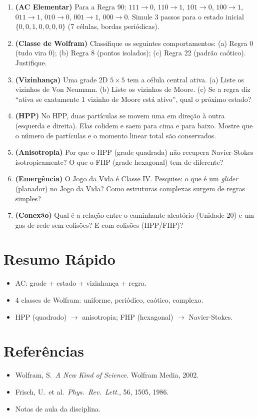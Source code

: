 \documentclass[12pt,a4paper]{article}
\begin{document}
\begin{enumerate}
  \item \textbf{(AC Elementar)} Para a Regra 90: $111\to0$, $110\to1$, $101\to0$, $100\to1$, $011\to1$, $010\to0$, $001\to1$, $000\to0$. Simule 3 passos para o estado inicial $\{0,0,1,0,0,0,0\}$ (7 c\'elulas, bordas peri\'odicas).
  
  \item \textbf{(Classe de Wolfram)} Classifique os seguintes comportamentos: (a) Regra 0 (tudo vira 0); (b) Regra 8 (pontos isolados); (c) Regra 22 (padr\~ao ca\'otico). Justifique.
  
  \item \textbf{(Vizinhan\c{c}a)} Uma grade 2D $5\times5$ tem a c\'elula central ativa. (a) Liste os vizinhos de Von Neumann. (b) Liste os vizinhos de Moore. (c) Se a regra diz ``ativa se exatamente 1 vizinho de Moore est\'a ativo'', qual o pr\'oximo estado?
  
  \item \textbf{(HPP)} No HPP, duas part\'iculas se movem uma em dire\c{c}\~ao \`a outra (esquerda e direita). Elas colidem e saem para cima e para baixo. Mostre que o n\'umero de part\'iculas e o momento linear total s\~ao conservados.
  
  \item \textbf{(Anisotropia)} Por que o HPP (grade quadrada) n\~ao recupera Navier-Stokes isotropicamente? O que o FHP (grade hexagonal) tem de diferente?
  
  \item \textbf{(Emergência)} O Jogo da Vida \'e Classe IV. Pesquise: o que \'e um \textit{glider} (planador) no Jogo da Vida? Como estruturas complexas surgem de regras simples?
  
  \item \textbf{(Conexão)} Qual \'e a rela\c{c}\~ao entre o caminhante aleat\'orio (Unidade 20) e um gas de rede sem colis\~oes? E com colis\~oes (HPP/FHP)?
\end{enumerate}

\section*{Resumo R\'apido}
\begin{itemize}
  \item AC: grade + estado + vizinhan\c{c}a + regra.
  \item 4 classes de Wolfram: uniforme, peri\'odico, ca\'otico, complexo.
  \item HPP (quadrado) $\to$ anisotropia; FHP (hexagonal) $\to$ Navier-Stokes.
\end{itemize}

\section*{Refer\^encias}
\begin{itemize}
  \item Wolfram, S.\ \textit{A New Kind of Science}. Wolfram Media, 2002.
  \item Frisch, U.\ et al.\ \textit{Phys.\ Rev.\ Lett.}, 56, 1505, 1986.
  \item Notas de aula da disciplina.
\end{itemize}
\end{document}
